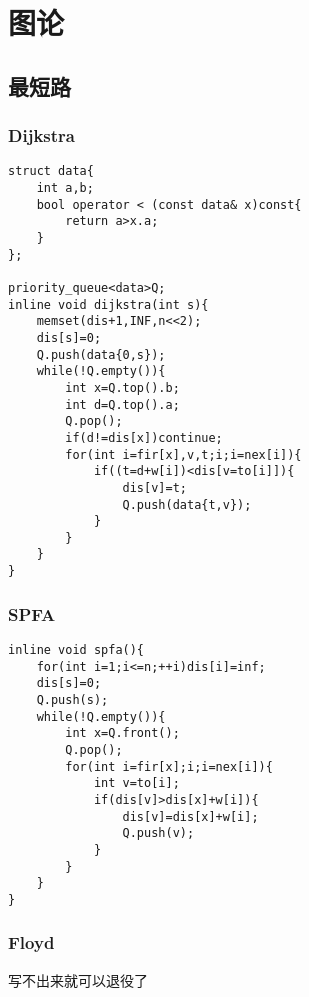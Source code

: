 \documentclass{ctexart}
\begin{document}
\section{图论}
\subsection{最短路}
\subsubsection{Dijkstra}
\begin{lstlisting}
struct data{
    int a,b;
    bool operator < (const data& x)const{
        return a>x.a;
    }
};

priority_queue<data>Q;
inline void dijkstra(int s){
    memset(dis+1,INF,n<<2);
    dis[s]=0;
    Q.push(data{0,s});
    while(!Q.empty()){
        int x=Q.top().b;
        int d=Q.top().a;
        Q.pop();
        if(d!=dis[x])continue;
        for(int i=fir[x],v,t;i;i=nex[i]){
            if((t=d+w[i])<dis[v=to[i]]){
                dis[v]=t;
                Q.push(data{t,v});
            }
        }
    }
}
\end{lstlisting}
\subsubsection{SPFA}
\begin{lstlisting}
inline void spfa(){
    for(int i=1;i<=n;++i)dis[i]=inf;
    dis[s]=0;
    Q.push(s);
    while(!Q.empty()){
        int x=Q.front();
        Q.pop();
        for(int i=fir[x];i;i=nex[i]){
            int v=to[i];
            if(dis[v]>dis[x]+w[i]){
                dis[v]=dis[x]+w[i];
                Q.push(v);
            }
        }
    }
}
\end{lstlisting}
\subsubsection{Floyd}
写不出来就可以退役了
\end{document}

